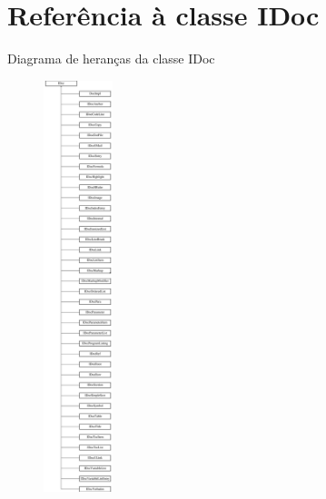 \hypertarget{class_i_doc}{\section{Referência à classe I\-Doc}
\label{class_i_doc}
}
Diagrama de heranças da classe I\-Doc\begin{figure}[H]
\begin{center}
\leavevmode
\includegraphics[height=12.000000cm]{class_i_doc}
\end{center}
\end{figure}
